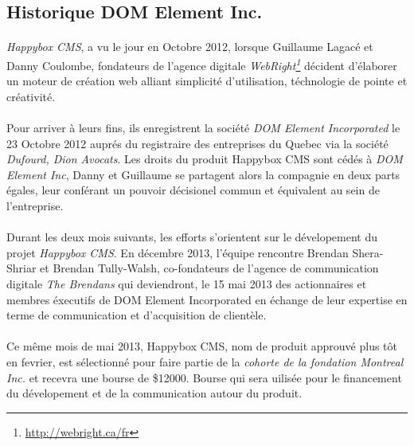 \documentclass[11pt, a4paper ]{article}
\begin{document}
\begin{spacing}{1.5}
		\subsection{Historique DOM Element Inc.}

\paragraph{}
\emph{Happybox CMS}, a vu le jour en Octobre 2012, lorsque Guillaume Lagacé et Danny Coulombe, fondateurs de l'agence digitale \emph{WebRight\footnote{\url{http://webright.ca/fr}}} décident d'élaborer un moteur de création web alliant simplicité d'utilisation, téchnologie de pointe et créativité.

\paragraph{}
Pour arriver à leurs fins, ils enregistrent la société \emph{DOM Element Incorporated} le 23 Octobre 2012 auprés du registraire des entreprises du Quebec via la société \emph{Dufourd, Dion Avocats}. Les droits du produit Happybox CMS sont cédés à \emph{DOM Element Inc}, Danny et Guillaume se partagent alors la compagnie en deux parts égales, leur conférant un pouvoir décisionel commun et équivalent au sein de l'entreprise.

\paragraph{}
Durant les deux mois suivants, les efforts s'orientent sur le dévelopement du projet \emph{Happybox CMS}.
En décembre 2013, l'équipe rencontre Brendan Shera-Shriar et Brendan Tully-Walsh, co-fondateurs de l'agence de communication digitale \emph{The Brendans} qui deviendront, le 15 mai 2013 des actionnaires et membres éxecutifs de DOM Element Incorporated en échange de leur expertise en terme de communication et d'acquisition de clientèle.

\paragraph{}
Ce même mois de mai 2013, Happybox CMS, nom de produit approuvé plus tôt en fevrier, est sélectionné pour faire partie de la \emph{cohorte de la fondation Montreal Inc.} et recevra une bourse de \$12000. Bourse qui sera uilisée pour le financement du dévelopement et de la communication autour du produit.


\end{spacing}
\end{document}
